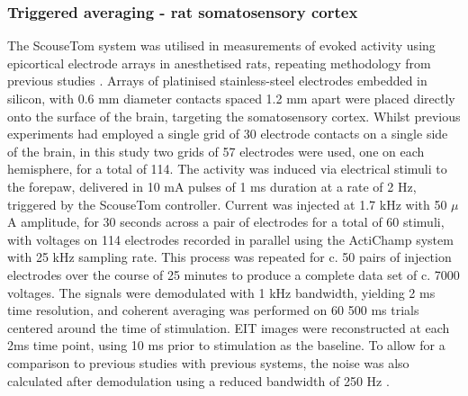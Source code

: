 \subsubsection{Triggered averaging - rat somatosensory cortex}
\label{MTrig}
The ScouseTom system was utilised in measurements of evoked activity using epicortical electrode arrays in anesthetised rats, repeating methodology from previous studies \cite{Aristovich_2016} \cite{Vongerichten_2016}. Arrays of platinised stainless-steel electrodes embedded in silicon, with 0.6 mm diameter contacts spaced 1.2 mm apart were placed directly onto the surface of the brain, targeting the somatosensory cortex. Whilst previous experiments had employed a single grid of 30 electrode contacts on a single side of the brain, in this study two grids of 57 electrodes were used, one on each hemisphere, for a total of 114. The activity was induced via electrical stimuli to the forepaw, delivered in 10 mA pulses of 1 ms duration at a rate of 2 Hz, triggered by the ScouseTom controller. Current was injected at 1.7 kHz with 50 $\mu$A amplitude, for 30 seconds across a pair of electrodes for a total of 60 stimuli, with voltages on 114 electrodes recorded in parallel using the ActiChamp system with 25 kHz sampling rate. This process was repeated for c. 50 pairs of injection electrodes over the course of 25 minutes to produce a complete data set of c. 7000 voltages. The signals were demodulated with 1 kHz bandwidth, yielding 2 ms time resolution, and coherent averaging was performed on 60 500 ms trials centered around the time of stimulation. EIT images were reconstructed at each 2ms time point, using 10 ms prior to stimulation as the baseline. To allow for a comparison to previous studies with previous systems, the noise was also calculated after demodulation using a reduced bandwidth of 250 Hz \cite{Oh2011}. 
